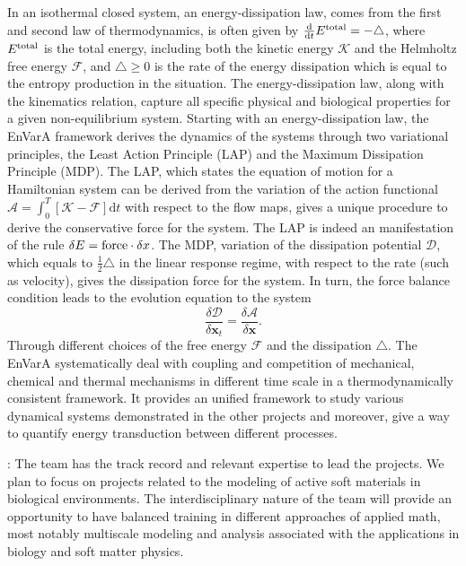 \documentclass[11pt]{NSFamsart}
\newcommand{\dd}{\mathrm{d}}
\newcommand{\x}{{\bm x}}
\begin{document}
In an isothermal closed system, an energy-dissipation law, comes from the first and second law of thermodynamics, is often given by $\frac{\dd}{\dd t} E^{\rm total} = - \triangle$,
where $E^{\rm total}$ is the total energy, including both the kinetic energy $\mathcal{K}$ and the Helmholtz free energy $\mathcal{F}$, and $\triangle \geq 0$ is the rate of the energy dissipation which is equal to the entropy production in the situation. The energy-dissipation law, along with the kinematics relation, %
capture all specific physical and biological properties for a given non-equilibrium system. Starting with an energy-dissipation law, the EnVarA framework derives the dynamics of the systems through two variational principles, the Least Action Principle (LAP) and the Maximum Dissipation Principle (MDP). The LAP, which states the equation of motion for a Hamiltonian system
can be derived from the variation of the action functional $\mathcal{A} = \int_{0}^T [\mathcal{K} - \mathcal{F}] \dd t$ with respect to the flow maps, gives a unique procedure to derive the conservative force for the system. The LAP is indeed an manifestation of the rule $\delta E = {\rm force} \cdot \delta x$. The MDP, variation of the dissipation potential $\mathcal{D}$, which equals to $\frac{1}{2}\triangle$ in the linear response regime, with respect to the rate (such as velocity), gives the dissipation force for the system. In turn, the force balance condition leads to the evolution equation to the system
\begin{equation*}
\frac{\delta \mathcal{D}}{\delta \x_t} = \frac{\delta \mathcal{A}}{\delta \x}.
\end{equation*}
Through different choices of the free energy $\mathcal{F}$ and the dissipation $\triangle$.
The EnVarA %
systematically deal with coupling and competition of mechanical, chemical and thermal mechanisms in different time scale in a thermodynamically consistent framework. It 
provides an unified framework to study various
dynamical systems demonstrated in the other projects and
moreover, give a way to quantify energy transduction between different processes.  

: 
The team has the track record and relevant expertise to lead the projects. We plan to focus on projects related to the modeling of active soft materials in biological environments.
The interdisciplinary nature of the team will provide an opportunity to have balanced training in different approaches of applied math, most notably multiscale modeling and analysis associated with the applications in biology and soft matter physics.
\end{document}
